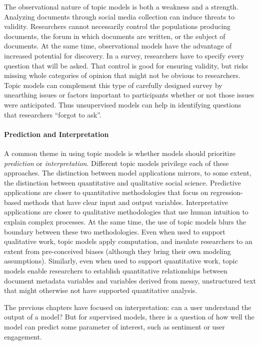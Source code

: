 The observational nature of topic models is both a weakness and a
strength.  Analyzing documents through social media collection can
induce threats to validity. Researchers cannot necessarily control the
populations producing documents, the forum in which documents are
written, or the subject of documents.  At the same time, observational
models have the advantage of increased potential for discovery.  In a
survey, researchers have to specify every question that will be asked.
That control is good for ensuring validity, but risks missing whole
categories of opinion that might not be obvious to researchers.  Topic
models can complement this type of carefully designed survey by
unearthing issues or factors important to participants
whether or not those issues were anticipated.  Thus unsupervised
models can help in identifying questions that researchers ``forgot to
ask''.

\paragraph{Prediction and Interpretation}

A common theme in using topic models is whether models
should prioritize \emph{prediction} or \emph{interpretation}. 
Different topic models privilege each of  these approaches.
The distinction between model applications mirrors, to some extent,  the distinction between quantitative and qualitative social science.
Predictive applications are closer to quantitative methodologies that focus on regression-based methods that have clear input and output variables.
Interpretative applications are closer to qualitative methodologies that use human intuition to explain complex processes.
At the same time, the use of topic models blurs the boundary between these two methodologies.
Even when used to support qualitative work, topic models apply computation, and insulate researchers to an extent from pre-conceived biases (although they bring their own modeling assumptions).
Similarly, even when used to support quantitative work, topic models enable researchers to establish quantitative relationships between document metadata variables and variables derived from messy, unstructured text that might otherwise not have supported  quantitative analysis.

The previous chapters have focused on interpretation: can a user
understand the output of a model?  But for supervised models, there is
a question of how well the model can predict some parameter of interest, such as sentiment or user engagement.  

